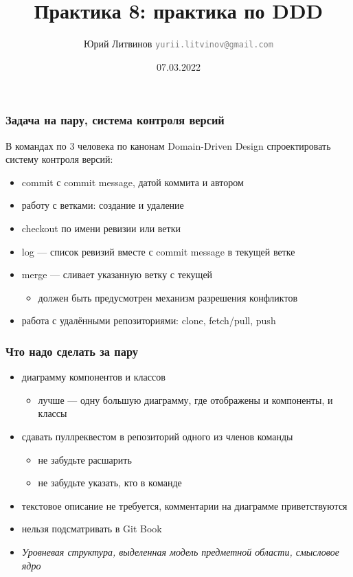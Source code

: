 \documentclass[xetex,mathserif,serif]{beamer}
\title{Практика 8: практика по DDD}
\author[Юрий Литвинов]{Юрий Литвинов \newline \textcolor{gray}{\small\texttt{yurii.litvinov@gmail.com}}}
\date{07.03.2022}
\begin{document}
    
    \frame{\titlepage}

    \begin{frame}
        \frametitle{Задача на пару, система контроля версий}
        В командах по 3 человека по канонам Domain-Driven Design спроектировать систему контроля версий:
        \begin{itemize}
            \item commit с commit message, датой коммита и автором
            \item работу с ветками: создание и удаление
            \item checkout по имени ревизии или ветки
            \item log --- список ревизий вместе с commit message в текущей ветке
            \item merge --- сливает указанную ветку с текущей
            \begin{itemize}
                \item должен быть предусмотрен механизм разрешения конфликтов
            \end{itemize}
            \item работа с удалёнными репозиториями: clone, fetch/pull, push
        \end{itemize}
    \end{frame}

    \begin{frame}
        \frametitle{Что надо сделать за пару}
        \begin{itemize}
            \item диаграмму компонентов и классов
            \begin{itemize}
                \item лучше --- одну большую диаграмму, где отображены и компоненты, и классы
            \end{itemize}
            \item сдавать пуллреквестом в репозиторий одного из членов команды
            \begin{itemize}
                \item не забудьте расшарить
                \item не забудьте указать, кто в команде
            \end{itemize}
            \item текстовое описание не требуется, комментарии на диаграмме приветствуются
            \item нельзя подсматривать в Git Book
            \item \emph{Уровневая структура, выделенная модель предметной области, смысловое ядро}
        \end{itemize}
    \end{frame}
\end{document}
